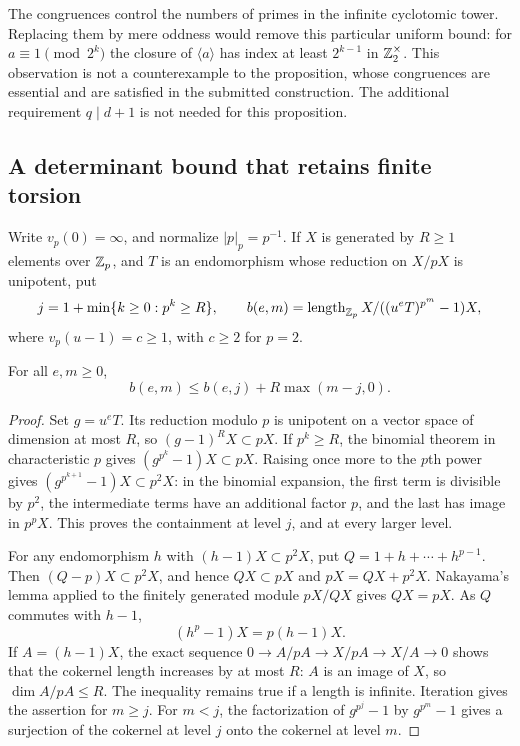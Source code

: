 \begin{remark}
The congruences control the numbers of primes in the infinite
cyclotomic tower. Replacing them by mere oddness would remove this
particular uniform bound: for $a\equiv1\pmod {2^k}$ the closure
of $\langle a\rangle$ has index at least $2^{k-1}$ in
$\mathbb Z_2^\times$. This observation is not a counterexample to the
proposition, whose congruences are essential and are satisfied in
the submitted construction. The additional requirement $q\mid d+1$
is not needed for this proposition.
\end{remark}

\subsection{A determinant bound that retains finite torsion}

Write $v_p(0)=\infty$, and normalize $|p|_p=p^{-1}$.
If $X$ is generated by $R\ge1$ elements over $\mathbb Z_p$, and
$T$ is an endomorphism whose reduction on $X/pX$ is unipotent,
put
\[
 j=1+\min\{k\ge0:p^k\ge R\},\qquad
 b(e,m)=\operatorname{length}_{\mathbb Z_p}X/((u^eT)^{p^m}-1)X,
\]
where $v_p(u-1)=c\ge1$, with $c\ge2$ for $p=2$.

\begin{lemma}
\label{ct-growth}
For all $e,m\ge0$,
\[
                    b(e,m)\le b(e,j)+R\max(m-j,0).
\]
\end{lemma}

\begin{proof}
Set $g=u^eT$. Its reduction modulo $p$ is unipotent on a vector
space of dimension at most $R$, so $(g-1)^R X\subset pX$.
If $p^k\ge R$, the binomial theorem in characteristic $p$ gives
$(g^{p^k}-1)X\subset pX$. Raising once more to the $p$th power
gives $(g^{p^{k+1}}-1)X\subset p^2X$: in the binomial expansion,
the first term is divisible by $p^2$, the intermediate terms have
an additional factor $p$, and the last has image in $p^pX$.
This proves the containment at level $j$, and at every larger level.

For any endomorphism $h$ with $(h-1)X\subset p^2X$, put
$Q=1+h+\cdots+h^{p-1}$. Then
$(Q-p)X\subset p^2X$, and hence
$QX\subset pX$ and $pX=QX+p^2X$.
Nakayama's lemma applied to the finitely generated module
$pX/QX$ gives $QX=pX$. As $Q$ commutes with $h-1$,
\[
                    (h^p-1)X=p(h-1)X.
\]
If $A=(h-1)X$, the exact sequence
$0\to A/pA\to X/pA\to X/A\to0$ shows that the cokernel
length increases by at most $R$: $A$ is an image of $X$, so
$\dim A/pA\le R$. The inequality remains true if a length is
infinite. Iteration gives the assertion for $m\ge j$.
For $m<j$, the factorization of $g^{p^j}-1$ by
$g^{p^m}-1$ gives a surjection of the cokernel at level $j$
onto the cokernel at level $m$.
\end{proof}

